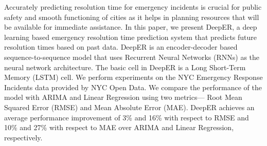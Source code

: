 Accurately predicting resolution time for emergency incidents is crucial for public safety and smooth functioning of cities as it helps in planning resources that will be available for immediate assistance. 
In this paper, we present DeepER, a deep learning based emergency resolution time prediction system that predicts future resolution times based on past data. DeepER is an encoder-decoder based sequence-to-sequence model that uses Recurrent Neural Networks (RNNs) as the neural network architecture. The basic cell in DeepER is a Long Short-Term Memory (LSTM) cell. We perform experiments on the NYC Emergency Response Incidents data provided by NYC Open Data. We compare the performance of the model with ARIMA and Linear Regression using two metrics--- Root Mean Squared Error (RMSE) and Mean Absolute Error (MAE). DeepER achieves an average performance improvement of 3\% and 16\% with respect to RMSE and 10\% and 27\% with respect to MAE over ARIMA and Linear Regression, respectively. %



